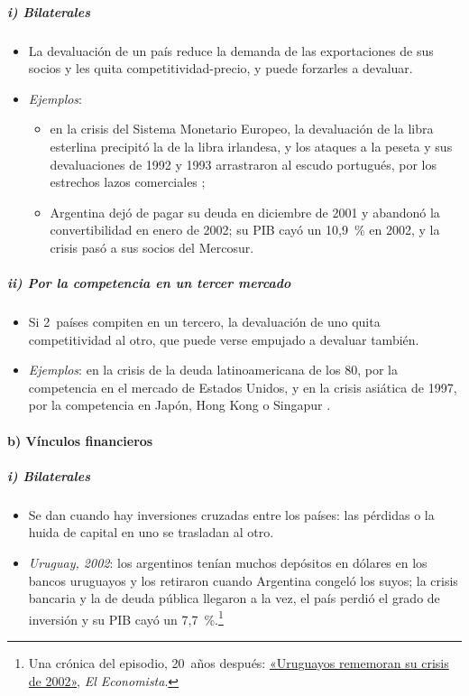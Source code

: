 \documentclass[11pt]{article}
\begin{document}
\subparagraph{i) Bilaterales}

\begin{itemize}
\item La devaluación de un país reduce la demanda de las exportaciones de sus socios y les quita competitividad-precio, y puede forzarles a devaluar.
\item \emph{Ejemplos}:
  \begin{itemize}
  \item en la crisis del Sistema Monetario Europeo, la devaluación de la libra esterlina precipitó la de la libra irlandesa, y los ataques a la peseta y sus devaluaciones de 1992 y 1993 arrastraron al escudo portugués, por los estrechos lazos comerciales\nocite{EichengreenWyplosz1993Unstable} ;
  \item Argentina dejó de pagar su deuda en diciembre de 2001 y abandonó la convertibilidad en enero de 2002\nocite{FMI2004IEOArgentina}; su PIB cayó un 10,9~\% en 2002, y la crisis pasó a sus socios del Mercosur\nocite{FMI2026WEOdatos}.
  \end{itemize}
\end{itemize}

\subparagraph{ii) Por la competencia en un tercer mercado}

\begin{itemize}
\item Si 2~países compiten en un tercero, la devaluación de uno quita competitividad al otro, que puede verse empujado a devaluar también.
\item \emph{Ejemplos}: en la crisis de la deuda latinoamericana de los 80, por la competencia en el mercado de Estados Unidos, y en la crisis asiática de 1997, por la competencia en Japón, Hong Kong o Singapur .
\end{itemize}

\paragraph{b) Vínculos financieros}

\subparagraph{i) Bilaterales}

\begin{itemize}
\item Se dan cuando hay inversiones cruzadas entre los países: las pérdidas o la huida de capital en uno se trasladan al otro.
\item \emph{Uruguay, 2002}: los argentinos tenían muchos depósitos en dólares en los bancos uruguayos y los retiraron cuando Argentina congeló los suyos; la crisis bancaria y la de deuda pública llegaron a la vez, el país perdió el grado de inversión y su PIB cayó un 7,7~\%\nocite{DelaPlazaSirtaine2005Uruguayan,FMI2026WEOdatos}.\footnote{Una crónica del episodio, 20~años después: \href{https://eleconomista.com.ar/politica/uruguayos-rememoran-su-crisis-2002-poder-olvidar-argentina-n55165}{«Uruguayos rememoran su crisis de 2002»}, \emph{El Economista}.}
\end{itemize}
\end{document}
